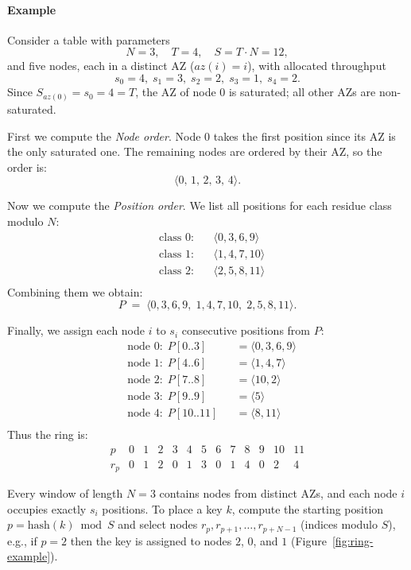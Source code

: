 \paragraph{Example}
Consider a table with parameters
\[
    N = 3,\quad
    T = 4,\quad
    S = T \cdot N = 12,
\]
and five nodes, each in a distinct AZ ($az(i) = i$), with allocated throughput
\[
    s_0 = 4,\; s_1 = 3,\; s_2 = 2,\; s_3 = 1,\; s_4 = 2.
\]
Since $S_{az(0)} = s_0 = 4 = T$, the AZ of node $0$ is saturated; all other AZs are non-saturated.

First we compute the \emph{Node order}.
Node $0$ takes the first position since its AZ is the only saturated one.
The remaining nodes are ordered by their AZ, so the order is:
\[
    \langle 0,\,1,\,2,\,3,\,4 \rangle.
\]

Now we compute the \emph{Position order}.
We list all positions for each residue class modulo $N$:
\[
    \begin{aligned}
        &\text{class }0: &&\langle 0,3,6,9 \rangle \\
        &\text{class }1: &&\langle 1,4,7,10 \rangle \\
        &\text{class }2: &&\langle 2,5,8,11 \rangle \\
    \end{aligned}
\]
Combining them we obtain:
\[
    P \;=\; \langle 0,3,6,9,\; 1,4,7,10,\; 2,5,8,11\rangle.
\]

Finally, we assign each node $i$ to $s_i$ consecutive positions from $P$:
\[
    \begin{aligned}
        &\text{node }0:\; P[0..3]  &&= \langle 0,3,6,9\rangle \\
        &\text{node }1:\; P[4..6]  &&= \langle 1,4,7\rangle \\
        &\text{node }2:\; P[7..8]  &&= \langle 10,2\rangle \\
        &\text{node }3:\; P[9..9]  &&= \langle 5\rangle \\
        &\text{node }4:\; P[10..11]&&= \langle 8,11\rangle \\
    \end{aligned}
\]
Thus the ring is:
\[
    \begin{array}{c|cccccccccccc}
        p   & 0 & 1 & 2 & 3 & 4 & 5 & 6 & 7 & 8 & 9 & 10 & 11 \\ \hline
        r_p & 0 & 1 & 2 & 0 & 1 & 3 & 0 & 1 & 4 & 0 & 2  & 4
    \end{array}
\]

Every window of length $N = 3$ contains nodes from distinct AZs, and each node
$i$ occupies exactly $s_i$ positions.
To place a key $k$, compute the starting position $p = \text{hash}(k) \bmod S$
and select nodes $r_p, r_{p+1}, \dots, r_{p+N-1}$ (indices modulo $S$), e.g.,
if $p = 2$ then the key is assigned to nodes $2$, $0$, and $1$
(Figure~\ref{fig:ring-example}).

